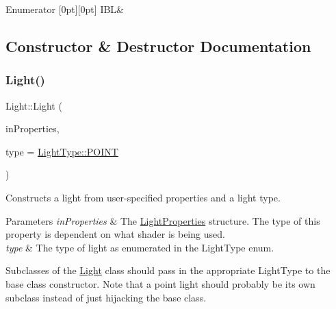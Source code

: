 \begin{DoxyEnumFields}{Enumerator}
[0pt][0pt]{}\hypertarget{class_light_a661d9480e01af8b1612860b9630ef5f8a239e71da0606abd283f2bccf1965badd}{}\label{class_light_a661d9480e01af8b1612860b9630ef5f8a239e71da0606abd283f2bccf1965badd} 
I\+BL&\\
\hline

\end{DoxyEnumFields}


\subsection{Constructor \& Destructor Documentation}
\hypertarget{class_light_adca12f0d5470bc3f2e6e77233ab3dcf1}{}\label{class_light_adca12f0d5470bc3f2e6e77233ab3dcf1} 
\subsubsection{\texorpdfstring{Light()}{Light()}}
{\footnotesize\ttfamily Light\+::\+Light (\begin{DoxyParamCaption}\item[{std\+::unique\+\_\+ptr$<$ struct \hyperlink{struct_light_properties}{Light\+Properties} $>$}]{in\+Properties,  }\item[{\hyperlink{class_light_a661d9480e01af8b1612860b9630ef5f8}{Light\+Type}}]{type = {\ttfamily \hyperlink{class_light_a661d9480e01af8b1612860b9630ef5f8aaebdbcb765394d25d6a604589a890f82}{Light\+Type\+::\+P\+O\+I\+NT}} }\end{DoxyParamCaption})}



Constructs a light from user-\/specified properties and a light type. 


\begin{DoxyParams}{Parameters}
{\em in\+Properties} & The \hyperlink{struct_light_properties}{Light\+Properties} structure. The type of this property is dependent on what shader is being used. \\
\hline
{\em type} & The type of light as enumerated in the Light\+Type enum.\\
\hline
\end{DoxyParams}
Subclasses of the \hyperlink{class_light}{Light} class should pass in the appropriate Light\+Type to the base class constructor. Note that a point light should probably be its own subclass instead of just hijacking the base class. \hypertarget{class_light_ad0e59fad13bb6cfadc25b2c477e9ddc7}{}\label{class_light_ad0e59fad13bb6cfadc25b2c477e9ddc7} 
